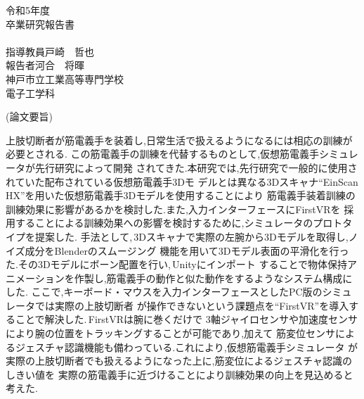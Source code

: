 \documentclass{ltjsreport}
\begin{document}
\begin{titlepage}
\begin{center}
\huge 令和5年度\\
\vspace{30pt}
\huge 卒業研究報告書\\
\vspace{50pt}
\HUGE{}\\
\vspace{250pt}
\huge 指導教員\hspace{10pt}戸崎　哲也\\
\huge 報告者\hspace{28pt}河合　将暉\\
\vspace{50pt}
\huge 神戸市立工業高等専門学校\\
\huge 電子工学科
\end{center}
\end{titlepage}
\restoregeometry
\clearpage

\begin{center}
\LARGE (論文要旨)
\end{center}

上肢切断者が筋電義手を装着し,日常生活で扱えるようになるには相応の訓練が必要とされる.
この筋電義手の訓練を代替するものとして,仮想筋電義手シミュレータが先行研究によって開発
されてきた.本研究では,先行研究で一般的に使用されていた配布されている仮想筋電義手3Dモ
デルとは異なる3Dスキャナ``EinScan HX''を用いた仮想筋電義手3Dモデルを使用することにより
筋電義手装着訓練の訓練効果に影響があるかを検討した.また,入力インターフェースにFirstVRを
採用することによる訓練効果への影響を検討するために,シミュレータのプロトタイプを提案した.
手法として,\,3Dスキャナで実際の左腕から3Dモデルを取得し,ノイズ成分をBlenderのスムージング
機能を用いて3Dモデル表面の平滑化を行った.その3Dモデルにボーン配置を行い,\,Unityにインポート
することで物体保持アニメーションを作製し,筋電義手の動作と似た動作をするようなシステム構成にした.
ここで,キーボード・マウスを入力インターフェースとしたPC版のシミュレータでは実際の上肢切断者
が操作できないという課題点を``FirstVR''を導入することで解決した.\,FirstVRは腕に巻くだけで
3軸ジャイロセンサや加速度センサにより腕の位置をトラッキングすることが可能であり,加えて
筋変位センサによるジェスチャ認識機能も備わっている.これにより,仮想筋電義手シミュレータ
が実際の上肢切断者でも扱えるようになった上に,筋変位によるジェスチャ認識のしきい値を
実際の筋電義手に近づけることにより訓練効果の向上を見込めると考えた.
\end{document}
